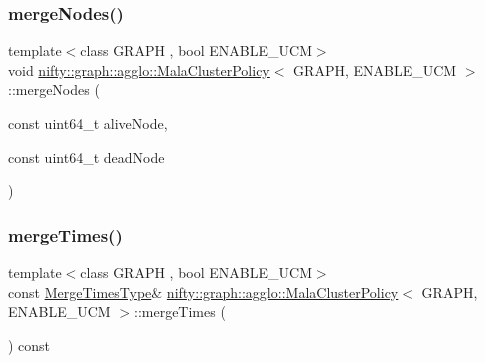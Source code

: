 \subsubsection{\texorpdfstring{merge\+Nodes()}{mergeNodes()}}
{\footnotesize\ttfamily template$<$class G\+R\+A\+PH , bool E\+N\+A\+B\+L\+E\+\_\+\+U\+CM$>$ \\
void \hyperlink{classnifty_1_1graph_1_1agglo_1_1MalaClusterPolicy}{nifty\+::graph\+::agglo\+::\+Mala\+Cluster\+Policy}$<$ G\+R\+A\+PH, E\+N\+A\+B\+L\+E\+\_\+\+U\+CM $>$\+::merge\+Nodes (\begin{DoxyParamCaption}\item[{const uint64\+\_\+t}]{alive\+Node,  }\item[{const uint64\+\_\+t}]{dead\+Node }\end{DoxyParamCaption})\hspace{0.3cm}{\ttfamily [inline]}}

\mbox{\label{classnifty_1_1graph_1_1agglo_1_1MalaClusterPolicy_a1d222663fca06945e4d195d452968e1b}} 
\subsubsection{\texorpdfstring{merge\+Times()}{mergeTimes()}}
{\footnotesize\ttfamily template$<$class G\+R\+A\+PH , bool E\+N\+A\+B\+L\+E\+\_\+\+U\+CM$>$ \\
const \hyperlink{classnifty_1_1graph_1_1agglo_1_1MalaClusterPolicy_aa786f31f24cedb64409047e19eb2e7c4}{Merge\+Times\+Type}\& \hyperlink{classnifty_1_1graph_1_1agglo_1_1MalaClusterPolicy}{nifty\+::graph\+::agglo\+::\+Mala\+Cluster\+Policy}$<$ G\+R\+A\+PH, E\+N\+A\+B\+L\+E\+\_\+\+U\+CM $>$\+::merge\+Times (\begin{DoxyParamCaption}{ }\end{DoxyParamCaption}) const\hspace{0.3cm}{\ttfamily [inline]}}

\mbox{\label{classnifty_1_1graph_1_1agglo_1_1MalaClusterPolicy_a8636a540ad4d07428f2fb77d6e24f3c0}} 
